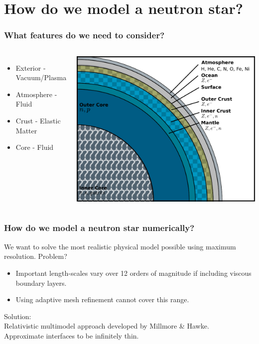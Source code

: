 \documentclass{beamer}
\begin{document}
\section{How do we model a neutron star?}
\begin{frame}
\frametitle{What features do we need to consider?}
\begin{columns}
\begin{itemize}
\item{Exterior - Vacuum/Plasma}
\item{Atmosphere - Fluid}
\item{Crust - Elastic Matter}
\item{Core - Fluid}
\end{itemize}
\includegraphics[width=\textwidth]{../images/neutron_star_structure}
\end{columns}
\end{frame}
\begin{frame}
\frametitle{How do we model a neutron star numerically?}
We want to solve the most realistic physical model possible using maximum resolution. Problem?
\begin{itemize}
\item{Important length-scales vary over 12 orders of magnitude if including viscous boundary layers.}
\item{Using adaptive mesh refinement cannot cover this range.}
\end{itemize}
Solution: \\
Relativistic multimodel approach developed by Millmore \& Hawke. \\
Approximate interfaces to be infinitely thin.
\end{frame}
\end{document}
